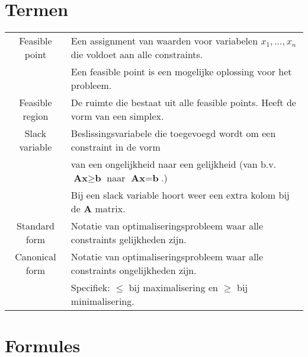 \documentclass[10pt,a4paper]{article}
\begin{document}
\section*{Termen}
\begin{tabular}{|c|l|}
\hline
Feasible point & Een assignment van waarden voor variabelen $x_1, ..., x_n$ die voldoet aan alle constraints. \\ 
& Een feasible point is een mogelijke oplossing voor het probleem.\\
\hline
Feasible region & De ruimte die bestaat uit alle feasible points. Heeft de vorm van een simplex. \\
\hline
Slack variable & Beslissingsvariabele die toegevoegd wordt om een constraint in de vorm \\ &van een ongelijkheid naar een gelijkheid (van b.v. $\textbf{Ax} \geq \textbf{b}$ naar $\textbf{Ax} = \textbf{b}$.)\\
& Bij een slack variable hoort weer een extra kolom bij de $\textbf{A}$ matrix. \\
\hline
Standard form & Notatie van optimaliseringsprobleem waar alle constraints gelijkheden zijn.\\
\hline
Canonical form & Notatie van optimaliseringsprobleem waar alle constraints ongelijkheden zijn.\\
 & Specifiek: $\le$ bij maximalisering en $\geq$ bij minimalisering. \\
\hline
\end{tabular} 

\section*{Formules}
\begin{description}
\item
\end{description}
\end{document}
